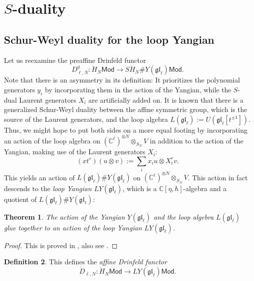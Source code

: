 \documentclass[11pt]{report}
\newtheorem{theorem}{Theorem}[section]
\theoremstyle{definition}
\newtheorem{definition}[theorem]{Definition}
\theoremstyle{remark}
\theoremstyle{remark}
\newcommand{\C}{\mathbb{C}}
\begin{document}
\section{$S$-duality}

\subsection{Schur-Weyl duality for the loop Yangian}

Let us reexamine the preaffine Drinfeld functor
\begin{equation*}
D_{\ell,N}^g: \ddot H_N\mathsf{Mod} \to S\ddot H_N \# Y(\mathfrak{gl}_\ell) \mathsf{Mod}.
\end{equation*}
Note that there is an asymmetry in its definition: It prioritizes the polynomial generators $y_i$ by incorporating them in the action of the Yangian, while the $S$-dual Laurent generators $X_i$ are artificially added on. It is known that there is a generalized Schur-Weyl duality between the affine symmetric group, which is the source of the Laurent generators, and the loop algebra $L(\mathfrak{gl}_\ell) := U(\mathfrak{gl}_\ell[t^{\pm 1}])$. Thus, we might hope to put both sides on a more equal footing by incorporating an action of the loop algebra on $(\C^\ell)^{\otimes N} \otimes_{S_N} V$ in addition to the action of the Yangian, making use of the Laurent generators $X_i$:
\begin{equation*}
(x t^r)(u \otimes v) := \sum_i x_i u \otimes X_i^r v.
\end{equation*}
This yields an action of $L(\mathfrak{gl}_\ell) \# Y(\mathfrak{gl}_\ell)$ on $(\C^\ell)^{\otimes N} \otimes_{S_N} V$. This action in fact descends to the \emph{loop Yangian $LY(\mathfrak{gl}_\ell)$}, which is a $\C[\eta,\hbar]$-algebra and a quotient of $L(\mathfrak{gl}_\ell) \# Y(\mathfrak{gl}_\ell)$:

\begin{theorem}
The action of the Yangian $Y(\mathfrak{gl}_\ell)$ and the loop algebra $L(\mathfrak{gl}_\ell)$ glue together to an action of the loop Yangian $LY(\mathfrak{gl}_\ell)$.
\end{theorem}

\begin{proof}
This is proved in \cite{article:guay:2005}, also see \cite{article:kodera:2016}.
\end{proof}

\begin{definition}
This defines the \emph{affine Drinfeld functor}
\begin{equation*}
\dot D_{\ell,N}: \ddot H_N\mathsf{Mod} \to LY(\mathfrak{gl}_\ell) \mathsf{Mod}.
\end{equation*}
\end{definition}
\end{document}
